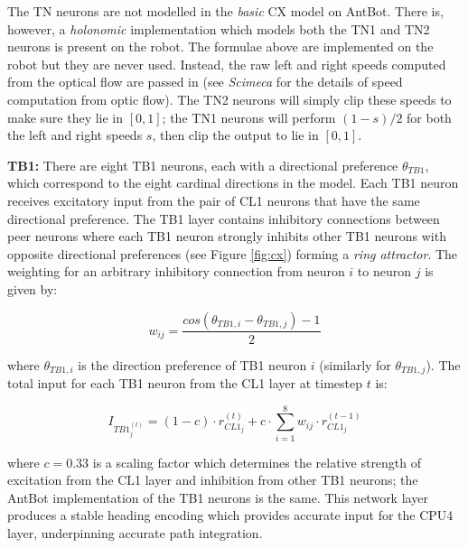 \documentclass[a4paper,11pt,twoside,openright]{article}
\begin{document}
The TN neurons are not modelled in the \textit{basic} CX model on AntBot. There
is, however, a \textit{holonomic} implementation which models both the TN1 and
TN2 neurons is present on the robot. The formulae above are implemented on the
robot but they are never used. Instead, the raw left and right speeds computed
from the optical flow are passed in (see \textit{Scimeca} \cite{Scimeca2017} for
the details of speed computation from optic flow). The TN2 neurons will simply
clip these speeds to make sure they lie in $[0,1]$; the TN1 neurons will perform
$(1 - s) / 2$ for both the left and right speeds $s$, then clip the output to lie
in $[0,1]$.
\newline
\par

\textbf{TB1:}
There are eight TB1 neurons, each with a directional preference $\theta_{TB1}$,
which correspond to the eight cardinal directions in the model. Each TB1 neuron
receives excitatory input from the pair of CL1 neurons that have the same
directional preference. The TB1 layer contains inhibitory connections between
peer neurons where each TB1 neuron strongly inhibits other TB1 neurons with
opposite directional preferences (see Figure \ref{fig:cx}) forming a
\textit{ring attractor}\cite{Stone2017}. The weighting for an arbitrary
inhibitory connection from neuron $i$ to neuron $j$ is given by:

\begin{equation}
  w_{ij} =
  \frac{cos(\theta_{TB1,i} - \theta_{TB1,j}) - 1}{2}
\end{equation}

where $\theta_{TB1,i}$ is the direction preference of TB1 neuron $i$ (similarly
for $\theta_{TB1,j}$). The total input for each TB1 neuron from the CL1 layer
at timestep $t$ is:

\begin{equation}
  I_{TB1_{j}^{(t)}} =
  (1 - c) \cdot r_{CL1_j}^{(t)} + c \cdot \sum_{i = 1}^{8} w_{ij}
  \cdot r_{CL1_j}^{(t - 1)}
\end{equation}

where $c = 0.33$ is a scaling factor which determines the relative strength
of excitation from the CL1 layer and inhibition from other TB1 neurons;
the AntBot implementation of the TB1 neurons is the same. This
network layer produces a stable heading encoding which provides accurate
input for the CPU4 layer, underpinning accurate path integration.
\newline
\par
\end{document}
